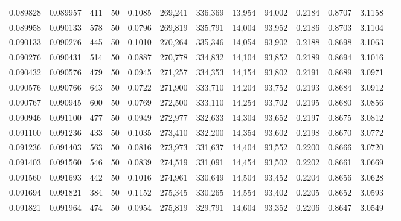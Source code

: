 \begin{tabular}{rrrrrrrrrrrrr}
0.089828 & 0.089957 &   411 &  50 &                                     0.1085 & 269,241 & 336,369 &  13,954 &  94,002 & 0.2184 & 0.8707 & 3.1158 \\
0.089958 & 0.090133 &   578 &  50 &                                     0.0796 & 269,819 & 335,791 &  14,004 &  93,952 & 0.2186 & 0.8703 & 3.1104 \\
0.090133 & 0.090276 &   445 &  50 &                                     0.1010 & 270,264 & 335,346 &  14,054 &  93,902 & 0.2188 & 0.8698 & 3.1063 \\
0.090276 & 0.090431 &   514 &  50 &                                     0.0887 & 270,778 & 334,832 &  14,104 &  93,852 & 0.2189 & 0.8694 & 3.1016 \\
0.090432 & 0.090576 &   479 &  50 &                                     0.0945 & 271,257 & 334,353 &  14,154 &  93,802 & 0.2191 & 0.8689 & 3.0971 \\
0.090576 & 0.090766 &   643 &  50 &                                     0.0722 & 271,900 & 333,710 &  14,204 &  93,752 & 0.2193 & 0.8684 & 3.0912 \\
0.090767 & 0.090945 &   600 &  50 &                                     0.0769 & 272,500 & 333,110 &  14,254 &  93,702 & 0.2195 & 0.8680 & 3.0856 \\
0.090946 & 0.091100 &   477 &  50 &                                     0.0949 & 272,977 & 332,633 &  14,304 &  93,652 & 0.2197 & 0.8675 & 3.0812 \\
0.091100 & 0.091236 &   433 &  50 &                                     0.1035 & 273,410 & 332,200 &  14,354 &  93,602 & 0.2198 & 0.8670 & 3.0772 \\
0.091236 & 0.091403 &   563 &  50 &                                     0.0816 & 273,973 & 331,637 &  14,404 &  93,552 & 0.2200 & 0.8666 & 3.0720 \\
0.091403 & 0.091560 &   546 &  50 &                                     0.0839 & 274,519 & 331,091 &  14,454 &  93,502 & 0.2202 & 0.8661 & 3.0669 \\
0.091560 & 0.091693 &   442 &  50 &                                     0.1016 & 274,961 & 330,649 &  14,504 &  93,452 & 0.2204 & 0.8656 & 3.0628 \\
0.091694 & 0.091821 &   384 &  50 &                                     0.1152 & 275,345 & 330,265 &  14,554 &  93,402 & 0.2205 & 0.8652 & 3.0593 \\
0.091821 & 0.091964 &   474 &  50 &                                     0.0954 & 275,819 & 329,791 &  14,604 &  93,352 & 0.2206 & 0.8647 & 3.0549 \\

\end{tabular}
